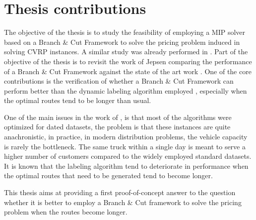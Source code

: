 \section{Thesis contributions}
The objective of the thesis is to study the feasibility of employing a MIP solver
based on a Branch \& Cut Framework to solve the pricing problem induced in solving
CVRP instances.
A similar study was already performed in \cite{Jepsen2014}.
Part of the objective of the thesis is to revisit the work of Jepsen comparing
the performance of a Branch \& Cut Framework against the state of the art work
\cite{pessoa2020generic}.
One of the core contributions is the verification of whether a Branch \& Cut Framework
can perform better than the dynamic labeling algorithm employed \cite{pessoa2020generic},
especially when the optimal routes tend to be longer than usual.

One of the main issues in the work of \cite{pessoa2020generic}, is that
most of the algorithms were optimized for dated datasets, the problem
is that these instances are quite anachronistic, in practice, in modern
distribution problems, the vehicle capacity is rarely the bottleneck.
The same truck within a single day is meant to serve a higher number of customers
compared to the widely employed standard datasets.
It is known that the labeling algorithm tend to deteriorate in performance when
the optimal routes that need to be generated tend to become longer.

This thesis aims at providing a first proof-of-concept answer to the question
whether it is better to employ a Branch \& Cut framework to solve the pricing problem
when the routes become longer.
